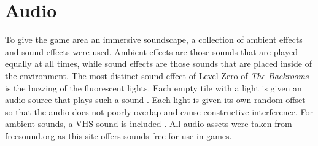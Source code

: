 \section{Audio}
To give the game area an immersive soundscape, a collection of ambient effects and sound effects were used. Ambient effects are those sounds that are played equally at all times, while sound effects are those sounds that are placed inside of the environment. The most distinct sound effect of Level Zero of \textit{The Backrooms} is the buzzing of the fluorescent lights. Each empty tile with a light is given an audio source that plays such a sound \cite{fluorescent_sound}. Each light is given its own random offset so that the audio does not poorly overlap and cause constructive interference. For ambient sounds, a VHS sound is included \cite{vhs_sound}. All audio assets were taken from \url{freesound.org} as this site offers sounds free for use in games.